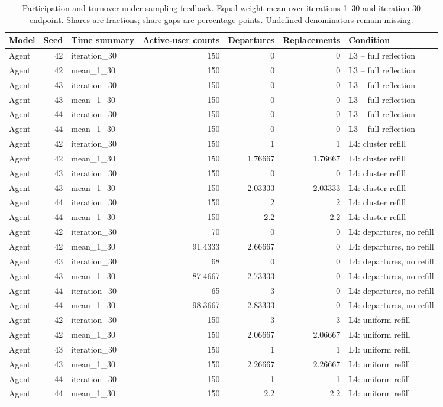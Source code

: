 \begin{table}[htbp!]
\centering
\small
\setlength{\tabcolsep}{3pt}
\renewcommand{\arraystretch}{1.1}
\begin{tabular}{lrlrrrl}
\hline
Model & Seed & Time summary & Active-user counts & Departures & Replacements & Condition \\
\hline
Agent & 42 & iteration\_30 & 150 & 0 & 0 & L3 -- full reflection \\
Agent & 42 & mean\_1\_30 & 150 & 0 & 0 & L3 -- full reflection \\
Agent & 43 & iteration\_30 & 150 & 0 & 0 & L3 -- full reflection \\
Agent & 43 & mean\_1\_30 & 150 & 0 & 0 & L3 -- full reflection \\
Agent & 44 & iteration\_30 & 150 & 0 & 0 & L3 -- full reflection \\
Agent & 44 & mean\_1\_30 & 150 & 0 & 0 & L3 -- full reflection \\
Agent & 42 & iteration\_30 & 150 & 1 & 1 & L4: cluster refill \\
Agent & 42 & mean\_1\_30 & 150 & 1.76667 & 1.76667 & L4: cluster refill \\
Agent & 43 & iteration\_30 & 150 & 0 & 0 & L4: cluster refill \\
Agent & 43 & mean\_1\_30 & 150 & 2.03333 & 2.03333 & L4: cluster refill \\
Agent & 44 & iteration\_30 & 150 & 2 & 2 & L4: cluster refill \\
Agent & 44 & mean\_1\_30 & 150 & 2.2 & 2.2 & L4: cluster refill \\
Agent & 42 & iteration\_30 & 70 & 0 & 0 & L4: departures, no refill \\
Agent & 42 & mean\_1\_30 & 91.4333 & 2.66667 & 0 & L4: departures, no refill \\
Agent & 43 & iteration\_30 & 68 & 0 & 0 & L4: departures, no refill \\
Agent & 43 & mean\_1\_30 & 87.4667 & 2.73333 & 0 & L4: departures, no refill \\
Agent & 44 & iteration\_30 & 65 & 3 & 0 & L4: departures, no refill \\
Agent & 44 & mean\_1\_30 & 98.3667 & 2.83333 & 0 & L4: departures, no refill \\
Agent & 42 & iteration\_30 & 150 & 3 & 3 & L4: uniform refill \\
Agent & 42 & mean\_1\_30 & 150 & 2.06667 & 2.06667 & L4: uniform refill \\
Agent & 43 & iteration\_30 & 150 & 1 & 1 & L4: uniform refill \\
Agent & 43 & mean\_1\_30 & 150 & 2.26667 & 2.26667 & L4: uniform refill \\
Agent & 44 & iteration\_30 & 150 & 1 & 1 & L4: uniform refill \\
Agent & 44 & mean\_1\_30 & 150 & 2.2 & 2.2 & L4: uniform refill \\
\hline
\end{tabular}
\caption{Participation and turnover under sampling feedback. Equal-weight mean over iterations 1--30 and iteration-30 endpoint. Shares are fractions; share gaps are percentage points. Undefined denominators remain missing.}
\label{chap:results:tab:rq1_sampling_population}
\end{table}
